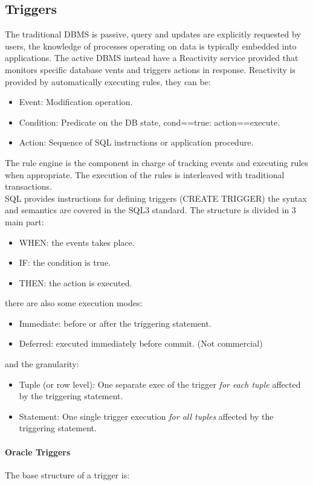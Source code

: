 \documentclass[12pt]{article}
\begin{document}
\subsection{Triggers}
The traditional DBMS is passive, query and updates are explicitly requested by users, the knowledge of processes operating on data is typically embedded into applications. The active DBMS instead have a Reactivity service provided that monitors specific database vents and triggers actions in response. Reactivity is provided by automatically executing rules, they can be:
\begin{itemize}
  \item Event: Modification operation.
  \item Condition: Predicate on the DB state, cond==true: action==execute.
  \item Action: Sequence of SQL instructions or application procedure.
\end{itemize}
The rule engine is the component in charge of tracking events and executing rules when appropriate. The execution of the rules is interleaved with traditional transactions.\\
SQL provides instructions for defining triggers (CREATE TRIGGER) the syntax and semantics are covered in the SQL3 standard. The structure is divided in 3 main part:
\begin{itemize}
  \item WHEN: the events takes place.
  \item IF: the condition is true.
  \item THEN: the action is executed.
\end{itemize}
there are also some execution modes:
\begin{itemize}
  \item Immediate: before or after the triggering statement.
  \item Deferred: executed immediately before commit. (Not commercial)
\end{itemize}
and the granularity:
\begin{itemize}
  \item Tuple (or row level): One separate exec of the trigger \textit{for each tuple} affected by the triggering statement.
  \item Statement: One single trigger execution \textit{for all tuples} affected by the triggering statement.
\end{itemize}

\paragraph{Oracle Triggers} %
The base structure of a trigger is:
\end{document}
